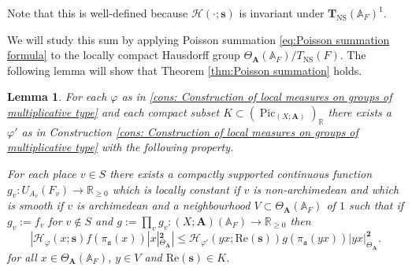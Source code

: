 \documentclass[a4paper,11pt,reqno]{amsart}
\newcommand{\R}{\mathbb{R}}
\newcommand{\A}{\mathbb{A}}
\DeclareMathOperator{\Pic}{Pic}
\DeclareMathOperator{\NS}{NS}
\renewcommand{\Re}{\mathrm{Re}}
\newtheorem{lemma}[theorem]{Lemma}
\theoremstyle{definition}
\begin{document}
Note that this is well-defined because $\mathcal{H}(\cdot ; {\bm{s}})$ is invariant under $\mathbf{T}_{\NS}(\A_{F})^1$.

We will study this sum by applying Poisson summation \eqref{eq:Poisson summation formula} to the locally compact Hausdorff group $\Theta_{\mathbf{A}}(\A_F)/T_{\NS}(F)$. The following lemma will show that Theorem \ref{thm:Poisson summation} holds.
\begin{lemma}\label{lem:Validity of Poisson summation formula}
	For each $\varphi$ as in \ref{cons: Construction of local measures on groups of multiplicative type} and each compact subset $K \subset (\Pic_{(X ; \mathbf{A})})_{\R}$ there exists a $\varphi'$ as in Construction \ref{cons: Construction of local measures on groups of multiplicative type} with the following property.
	
	For each place $v \in S$ there exists a compactly supported continuous function $g_v: U_{A_v}(F_v) \to \R_{\geq 0}$ which is locally constant if $v$ is non-archimedean and which is smooth if $v$ is archimedean and a neighbourhood $V \subset \Theta_{\mathbf{A}}(\A_F)$ of $1$ such that if $g_v := f_v$ for $v \not \in S$ and $g := \prod_v g_v: (X ; \mathbf{A})(\A_F) \to \R_{\geq 0}$ then 
	\[
	|\mathcal{H}_{\varphi}(x ; {\bm{s}}) f(\pi_{\mathfrak{a}}(x))|x|^{\mathbf{2}}_{\Theta_{\mathbf{A}}}| \leq \mathcal{H}_{\varphi'}(y x ; {\Re(\bm{s})}) g(\pi_{\mathfrak{a}}(y x))|y x|^{\mathbf{2}}_{\Theta_{\mathbf{A}}}.
	\]
 	for all $x \in \Theta_{\mathbf{A}}(\A_F)$, $y \in V$ and $\Re(\bm{s}) \in K$. 
\end{lemma} 
\end{document}
